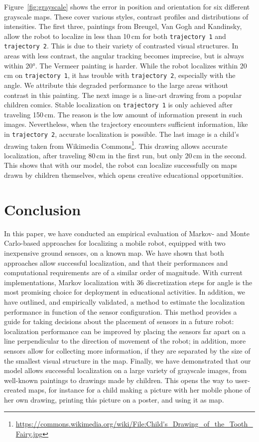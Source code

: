 \documentclass[letterpaper, 10pt, conference]{ieeeconf}
\newcommand{\Fig}[1]{Figure~\ref{fig:#1}}
\begin{document}
\Fig{grayscale} shows the error in position and orientation for six different grayscale maps.
These cover various styles, contrast profiles and distributions of intensities.
The first three, paintings from Breugel, Van Gogh and Kandinsky, allow the robot to localize in less than 10\,cm for both \texttt{trajectory~1} and \texttt{trajectory~2}.
This is due to their variety of contrasted visual structures.
In areas with less contrast, the angular tracking becomes imprecise, but is always within 20°.
The Vermeer painting is harder.
While the robot localizes within 20\,cm on \texttt{trajectory~1}, it has trouble with \texttt{trajectory~2}, especially with the angle.
We attribute this degraded performance to the large areas without contrast in this painting.
The next image is a line-art drawing from a popular children comics.
Stable localization on \texttt{trajectory~1} is only achieved after traveling 150\,cm.
The reason is the low amount of information present in such images.
Nevertheless, when the trajectory encounters sufficient information, like in \texttt{trajectory~2}, accurate localization is possible.
The last image is a child's drawing taken from Wikimedia Commons\footnote{\url{https://commons.wikimedia.org/wiki/File:Child's_Drawing_of_the_Tooth_Fairy.jpg}}.
This drawing allows accurate localization, after traveling 80\,cm in the first run, but only 20\,cm in the second.
This shows that with our model, the robot can localize successfully on maps drawn by children themselves, which opens creative educational opportunities.

\section{Conclusion}

In this paper, we have conducted an empirical evaluation of Markov- and Monte Carlo-based approaches for localizing a mobile robot, equipped with two inexpensive ground sensors, on a known map.
We have shown that both approaches allow successful localization, and that their performances and computational requirements are of a similar order of magnitude.
With current implementations, Markov localization with 36 discretization steps for angle is the most promising choice for deployment in educational activities.
In addition, we have outlined, and empirically validated, a method to estimate the localization performance in function of the sensor configuration.
This method provides a guide for taking decisions about the placement of sensors in a future robot:
localization performance can be improved by placing the sensors far apart on a line perpendicular to the direction of movement of the robot; in addition, more sensors allow for collecting more information, if they are separated by the size of the smallest visual structure in the map.
Finally, we have demonstrated that our model allows successful localization on a large variety of grayscale images, from well-known paintings to drawings made by children.
This opens the way to user-created maps, for instance for a child making a picture with her mobile phone of her own drawing, printing this picture on a poster, and using it as map.
\end{document}
